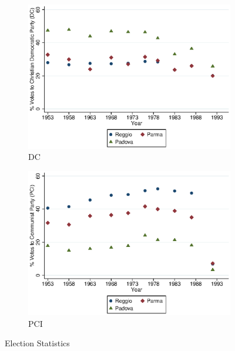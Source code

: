     
    \begin{figure}[H]
      \centering
        \begin{subfigure}[t]{0.49\textwidth}
          \includegraphics[width=\textwidth]{../../output/image/DC.eps}       
\caption{DC}        
        \end{subfigure}
        \begin{subfigure}[t]{0.49\textwidth}
          \includegraphics[width=\textwidth]{../../output/image/PCI.eps}       
 \caption{PCI}        
        \end{subfigure}
      \caption{Election Statistics}  \label{fig:election}
    \end{figure}